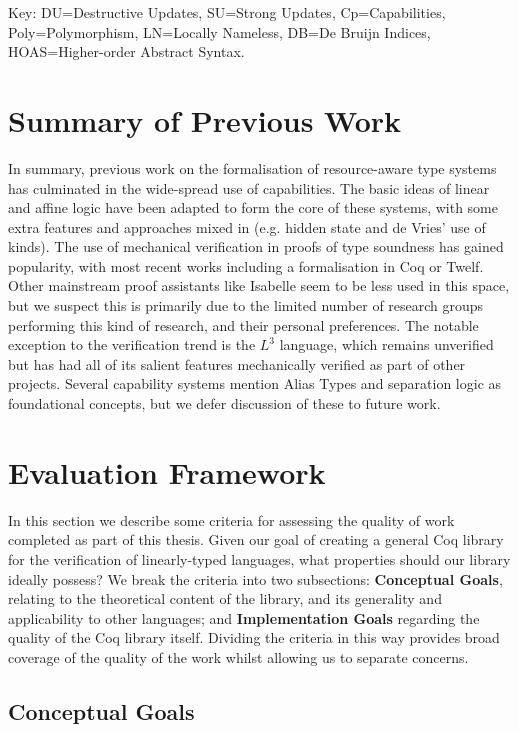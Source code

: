 \documentclass[]{unswthesis}
\let\b\textbf
\begin{document}
Key: DU=Destructive Updates, SU=Strong Updates, Cp=Capabilities, Poly=Polymorphism, LN=Locally Nameless, DB=De Bruijn Indices, HOAS=Higher-order Abstract Syntax.

\section{Summary of Previous Work}

In summary, previous work on the formalisation of resource-aware type systems has culminated in the wide-spread use of capabilities. The basic ideas of linear and affine logic have been adapted to form the core of these systems, with some extra features and approaches mixed in (e.g. hidden state and de Vries' use of kinds). The use of mechanical verification in proofs of type soundness has gained popularity, with most recent works including a formalisation in Coq or Twelf. Other mainstream proof assistants like Isabelle seem to be less used in this space, but we suspect this is primarily due to the limited number of research groups performing this kind of research, and their personal preferences. The notable exception to the verification trend is the $L^3$ language, which remains unverified but has had all of its salient features mechanically verified as part of other projects. Several capability systems mention Alias Types \cite{smith00} and separation logic \cite{reynolds02} as foundational concepts, but we defer discussion of these to future work.

\section{Evaluation Framework}

In this section we describe some criteria for assessing the quality of work completed as part of this thesis. Given our goal of creating a general Coq library for the verification of linearly-typed languages, what properties should our library ideally possess? We break the criteria into two subsections: \b{Conceptual Goals}, relating to the theoretical content of the library, and its generality and applicability to other languages; and \b{Implementation Goals} regarding the quality of the Coq library itself. Dividing the criteria in this way provides broad coverage of the quality of the work whilst allowing us to separate concerns.

\subsection{Conceptual Goals}
\end{document}

